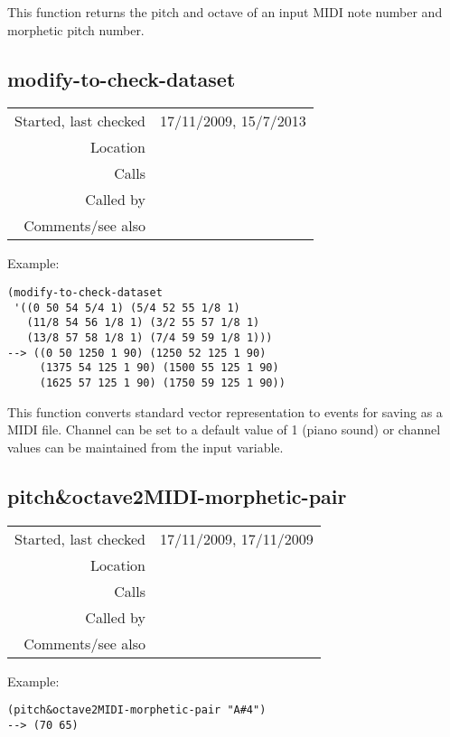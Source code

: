 \noindent This function returns the pitch and octave
of an input MIDI note number and morphetic pitch
number.


\subsection*{modify-to-check-dataset}\label{fun:modify-to-check-dataset}

\vspace{0.3cm}
\begin{tabular}{r|p{8cm}}
Started, last checked & 17/11/2009, 15/7/2013 \\
Location & \nameref{sec:director-musices} \\
Calls & \\
Called by & \\
Comments/see also &
\end{tabular}

\vspace{0.5cm}
\noindent Example:
\begin{verbatim}
(modify-to-check-dataset
 '((0 50 54 5/4 1) (5/4 52 55 1/8 1)
   (11/8 54 56 1/8 1) (3/2 55 57 1/8 1)
   (13/8 57 58 1/8 1) (7/4 59 59 1/8 1))) 
--> ((0 50 1250 1 90) (1250 52 125 1 90)
     (1375 54 125 1 90) (1500 55 125 1 90)
     (1625 57 125 1 90) (1750 59 125 1 90))
\end{verbatim}

\noindent This function converts standard vector
representation to events for saving as a MIDI file. Channel can be set to a default value of 1 (piano sound) or channel
values can be maintained from the input variable.


\subsection*{pitch\&octave2MIDI-morphetic-pair}\label{fun:pitch-and-octave2MIDI-morphetic-pair}

\vspace{0.3cm}
\begin{tabular}{r|p{8cm}}
Started, last checked & 17/11/2009, 17/11/2009 \\
Location & \nameref{sec:director-musices} \\
Calls & \\
Called by & \nameref{fun:director-musice2datapoint} \\
Comments/see also &
\end{tabular}

\vspace{0.5cm}
\noindent Example:
\begin{verbatim}
(pitch&octave2MIDI-morphetic-pair "A#4")
--> (70 65)
\end{verbatim}

